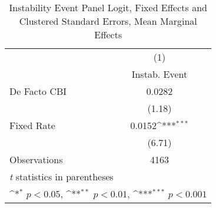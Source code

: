 \begin{table}[htbp]\centering
\def\sym#1{\ifmmode^{#1}\else\(^{#1}\)\fi}
\caption{Instability Event Panel Logit, Fixed Effects and Clustered Standard Errors, Mean Marginal Effects \label{margsJustBinInstabEventDF}}
\begin{tabular}{l*{1}{c}}
\toprule
                                        &\multicolumn{1}{c}{(1)}\\
                                        &\multicolumn{1}{c}{Instab. Event}\\
\midrule
De Facto CBI                            &   0.0282         \\
                                        &   (1.18)         \\
\addlinespace
Fixed Rate                              &   0.0152\sym{***}\\
                                        &   (6.71)         \\
\midrule
Observations                            &     4163         \\
\bottomrule
\multicolumn{2}{l}{\footnotesize \textit{t} statistics in parentheses}\\
\multicolumn{2}{l}{\footnotesize \sym{*} \(p<0.05\), \sym{**} \(p<0.01\), \sym{***} \(p<0.001\)}\\
\end{tabular}
\end{table}

